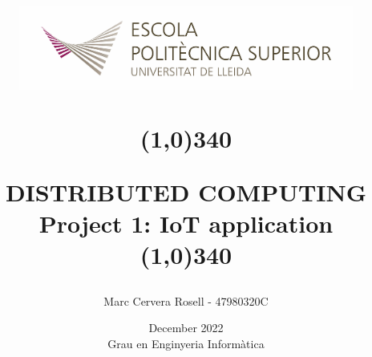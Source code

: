 \title{
	\begin{center}
	\vspace{3cm}
	\includegraphics[width=11cm, height=3cm]{images/Logo-nou-eps.jpg}
	\end{center}
	\begin{center}
	\line(1,0){340}
	\end{center}		
	DISTRIBUTED COMPUTING\\
	\vspace{2mm}
	\Large Project 1: IoT application\\
	\line(1,0){340}
	\vspace{2.5cm}
	}

\author{Marc Cervera Rosell - 47980320C \vspace{1cm}}


\date{December 2022\vspace{0.5cm} \\Grau en Enginyeria Informàtica}